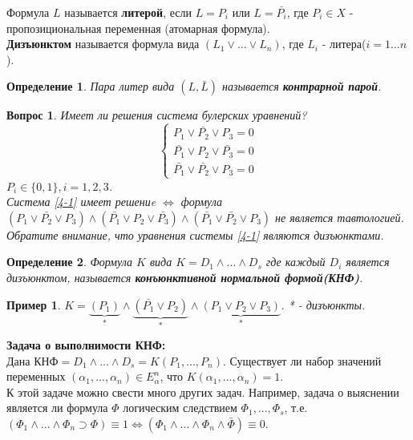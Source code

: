 \documentclass{article}
\newtheorem{example}{Пример}
\newtheorem{question}{Вопрос}
\newtheorem{definition}{Определение}
\numberwithin{example}{section}
\numberwithin{question}{section}
\numberwithin{Remark}{section}
\numberwithin{theorem}{section}
\numberwithin{definition}{section}
\numberwithin{proposition}{section}
\begin{document}
Формула $L$ называется \textbf{литерой}, если $L=P_i$ или $L=\bar{P_i}$, где $P_i \in X$ - пропозициональная переменная (атомарная формула).\\
\textbf{Дизъюнктом} называется формула вида $(L_1 \lor ... \lor L_n)$, где $L_i$ - литера($i=1\ldots n$).
\begin{definition}
Пара литер вида $(L,\bar{L})$ называется \textbf{контрарной парой}.
\end{definition}
\begin{question}
	Имеет ли решения система булерских уравнений?\\
	\begin{equation}
	\label{4-1}
	\left\{\begin{array}{cc}
	P_1 \lor \bar{P_2}\lor P_3 =0\\
	\bar{P_1}\lor P_2\lor \bar{P_3}=0\\
	\bar{P_1}\lor \bar{P_2}\lor P_3 =0
	\end{array}\right.
	\end{equation}
	$P_i \in \{0,1\},i=1,2,3$.\\
	Система \eqref{4-1} имеет решениe $\Leftrightarrow$ формула $(P_1 \lor \bar{P_2}\lor P_3)\land (\bar{P_1}\lor P_2 \lor \bar{P_3})\land (\bar{P_1}\lor \bar{P_2}\lor P_3)$ не является тавтологией. Обратите внимание, что уравнения системы \eqref{4-1} являются дизъюнктами.
\end{question}
\begin{definition}
Формула $K$ вида $K=D_1 \land ... \land D_s$ где каждый $D_i$ является дизъюнктом, называется \textbf{конъюнктивной нормальной формой(КНФ)}.
\end{definition}
\begin{example}
	$K=\underbrace{(P_1)}_{*}\land \underbrace{(\bar{P_1}\lor P_2)}_{*}\land \underbrace{(P_1 \lor P_2 \lor P_3)}_{*}$. * - дизъюнкты.
\end{example}
\textbf{Задача о выполнимости КНФ:}\\
Дана КНФ$=D_1\land ... \land D_s =K(P_1,...,P_n)$. Существует ли набор значений переменных $(\alpha_1 ,...,\alpha_n)\in E_{\alpha}^n$, что $K(\alpha_1 ,..., \alpha_n)=1$.\\
К этой задаче можно свести много других задач. Например, задача о выяснении является ли формула $\Phi$ логическим следствием $\Phi_1 ,..., \Phi_s$, т.е.\\
$(\Phi_1 \land ... \land \Phi_n \supset \Phi)\equiv 1 \Leftrightarrow (\Phi_1 \land ... \land \Phi_n \land \bar{\Phi})\equiv 0$.\\
\end{document}
